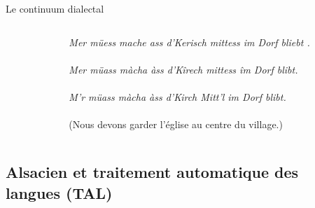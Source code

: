 \documentclass[french]{beamer}
\begin{document}
\begin{frame}{Le continuum dialectal}
  \begin{columns}
    \begin{column}{0.25\textwidth}
    \end{column}
    \begin{column}{0.85\textwidth}

      \small
      \textit{Mer müess mache ass d'Kerisch mittess im Dorf bliebt . \\~\\
        Mer müass màcha àss d’Kîrech mittess îm Dorf blibt.\\~\\ %
        M'r müass màcha àss d'Kirch Mitt'l im Dorf blibt.\\~\\  %
      }
      (Nous devons garder l'église au centre du village.)
    \end{column}
  \end{columns}
  \begin{center}
  \end{center}
\end{frame}

\subsection{Alsacien et traitement automatique des langues (TAL)}
\end{document}

